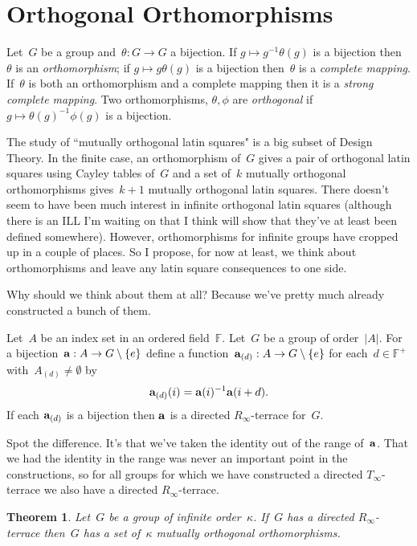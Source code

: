\documentclass[a4paper,12pt]{article}
\newtheorem{thm}{Theorem}
\newcommand{\F}{\mathbb{F}}
\begin{document}
\section{Orthogonal Orthomorphisms}

Let~$G$ be a group and~$\theta: G \rightarrow G$ a bijection.  If $g \mapsto g^{-1}\theta(g)$ is a bijection then~$\theta$ is an {\em orthomorphism}; if  $g \mapsto g\theta(g)$ is a bijection then~$\theta$ is a {\em complete mapping}.  If~$\theta$ is both an orthomorphism and a complete mapping then it is a {\em strong complete mapping}.  Two orthomorphisms, $\theta, \phi$ are {\em orthogonal} if $g \mapsto \theta(g)^{-1} \phi(g)$ is a bijection.

The study of ``mutually orthogonal latin squares" is a big subset of Design Theory.   In the finite case, an orthomorphism of~$G$ gives a pair of orthogonal latin squares using Cayley tables of~$G$ and a set of~$k$ mutually orthogonal orthomorphisms gives~$k+1$ mutually orthogonal latin squares.  There doesn't seem to have been much interest in infinite orthogonal latin squares (although there is an ILL I'm waiting on that I think will show that they've at least been defined somewhere).  However, orthomorphisms for infinite groups have cropped up in a couple of places.   So I propose, for now at least, we think about orthomorphisms and leave any latin square consequences to one side.

Why should we think about them at all?  Because we've pretty much already constructed a bunch of them.

Let~$A$ be an index set in an ordered field~$\F$.  Let~$G$ be a group of order~$|A|$.  For a bijection~${\bf a}: A \rightarrow G \setminus \{ e \}$ define a function~${\bf a}_{(d)}: A \rightarrow G \setminus \{ e \}$ for each~$d \in \F^+$ with~$A_{(d)} \neq \emptyset$ by
$${\bf a}_{(d)}(i) = {\bf a}(i)^{-1}{\bf a}(i+d).$$
If each ${\bf a}_{(d)}$ is a bijection then ${\bf a}$ is  a directed $R_{\infty}$-terrace for~$G$.

Spot the difference.  It's that we've taken the identity out of the range of~${\bf a}$.  That we had the identity in the range was never an important point in the constructions, so for all groups for which we have constructed a directed $T_{\infty}$-terrace we also have a directed $R_{\infty}$-terrace.



\begin{thm}
Let~$G$ be a group of infinite order~$\kappa$.  If~$G$ has a directed $R_{\infty}$-terrace then~$G$ has a set of~$ \kappa$ mutually orthogonal orthomorphisms. 
\end{thm}
\end{document}
